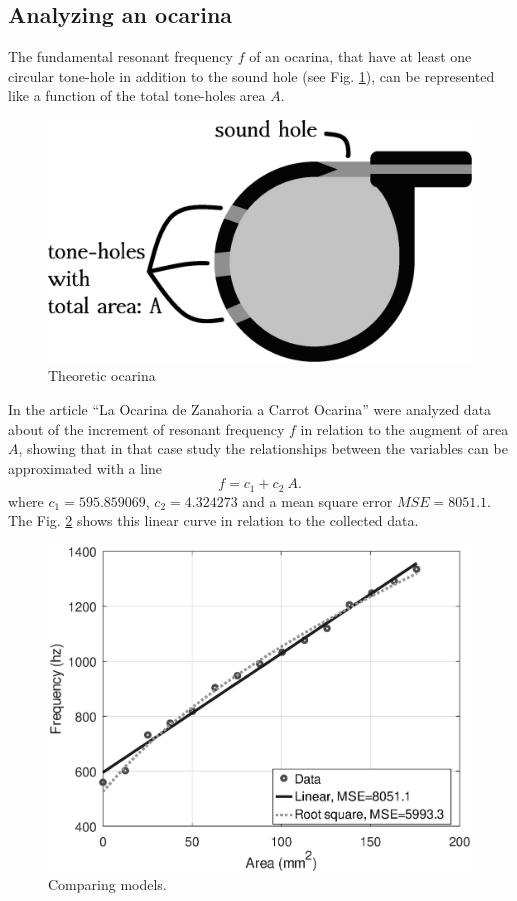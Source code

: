 \documentclass[11pt,twocolumn]{article}
\begin{document}
\subsection{Analyzing an ocarina}
\label{subsec:analyzing}
The fundamental resonant frequency $f$ of an ocarina, 
that have at least one circular tone-hole %
in addition to the sound hole (see Fig. \ref{fig:ocarina-teorica}),
can be represented like a function of the total tone-holes area $A$.


\begin{figure}[ht!]
\centering
\includegraphics[width=0.750\columnwidth]{ocarina-teorica.eps}
\caption{Theoretic ocarina}
\label{fig:ocarina-teorica}
\end{figure}

In the article ``La Ocarina de Zanahoria a Carrot Ocarina'' \citep{mp2010ocarina}
were analyzed data about of the increment of resonant frequency $f$ in relation to the augment of area $A$,
showing that in that case study the relationships between the variables can be approximated with a line 
\begin{equation}
f=c_1+ c_2~A.
\end{equation}
where $c_1=595.859069$, $c_2=4.324273$ and a mean square error $MSE=8051.1$.
The Fig. \ref{fig:models} shows this linear curve in relation to the collected data.


\begin{figure}[ht!]
\centering
\includegraphics[width=0.850\columnwidth]{compara.eps}
\caption{Comparing models. }
\label{fig:models}
\end{figure}
\end{document}
